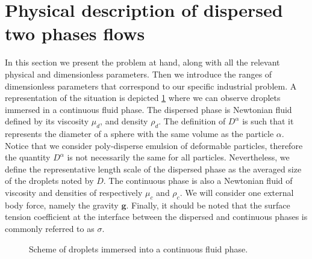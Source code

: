 \section{Physical description of dispersed two phases flows}

In this section we present the problem at hand, along with all the relevant physical and dimensionless parameters.
Then we introduce the ranges of dimensionless parameters that correspond to our specific industrial problem. 
A representation of the situation is depicted \ref{fig:scheme} where we can observe droplets immersed in a continuous fluid phase.
The dispersed phase is Newtonian fluid defined by its viscosity $\mu_d$, and density $\rho_d$. 
The definition of $D^\alpha$ is such that it represents the diameter of a sphere with the same volume as the particle $\alpha$.
Notice that we consider poly-disperse emulsion of deformable particles, therefore the quantity $D^\alpha$ is not necessarily the same for all particles.   
Nevertheless, we define the representative length scale of the dispersed phase as the averaged size of the droplets noted by $D$. 
The continuous phase is also a Newtonian fluid of viscosity and densities of respectively $\mu_c$ and $\rho_c$.  
We will consider one external body force, namely the gravity $\textbf{g}$. 
Finally, it should be noted that the surface tension coefficient at the interface between the dispersed and continuous phases is commonly referred to as $\sigma$.
\begin{figure}[h!]
    \centering
    \caption{Scheme of droplets immersed into a continuous fluid phase.}
    \label{fig:scheme}
\end{figure}

